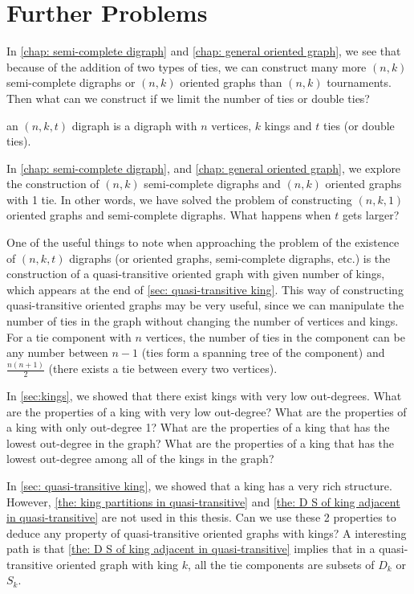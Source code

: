 \chapter{Further Problems}

In \cref{chap: semi-complete digraph} and \cref{chap: general oriented graph},
we see that because of the addition of two types of ties,
we can construct many more \((n, k)\) semi-complete digraphs
or \((n, k)\) oriented graphs than \((n, k)\) tournaments.
Then what can we construct if we limit the number of ties
or double ties?

\begin{definition}
  an \((n, k, t)\) digraph is a digraph with \(n\) vertices,
  \(k\) kings and \(t\) ties (or double ties).
\end{definition}

In \cref{chap: semi-complete digraph}, and \cref{chap: general oriented graph},
we explore the construction of \((n, k)\) semi-complete digraphs
and \((n, k)\) oriented graphs with 1 tie.
In other words, we have solved the problem of constructing
\((n, k, 1)\) oriented graphs and semi-complete digraphs.
What happens when \(t\) gets larger?

One of the useful things to note when approaching the
problem of the existence of \((n, k, t)\) digraphs
(or oriented graphs, semi-complete digraphs, etc.)
is the construction of a quasi-transitive oriented graph
with given number of kings, which appears at the end of
 \cref{sec: quasi-transitive king}.
This way of constructing quasi-transitive oriented graphs
may be very useful,
since we can manipulate the number of ties in the graph
without changing the number of vertices and kings.
For a tie component with \(n\) vertices,
the number of ties in the component can be any number
between \(n - 1\)
(ties form a spanning tree of the component)
and \(\frac{n(n+1)}{2}\)
(there exists a tie between every two vertices).

In \cref{sec:kings}, we showed that there exist kings with very
low out-degrees.
What are the properties of a king with very low out-degree?
What are the properties of a king with only out-degree 1?
What are the properties of a king that has the lowest out-degree
in the graph?
What are the properties of a king that has the lowest out-degree
among all of the kings in the graph?

In \cref{sec: quasi-transitive king},
we showed that a king has a very rich structure.
However, \cref{the: king partitions in quasi-transitive}
and \cref{the: D S of king adjacent in quasi-transitive}
are not used in this thesis.
Can we use these 2 properties to deduce any property
of quasi-transitive oriented graphs with kings?
A interesting path is that
\cref{the: D S of king adjacent in quasi-transitive}
implies that in a quasi-transitive oriented graph with king \(k\),
all the tie components are subsets of \(D_k\) or \(S_k\).

